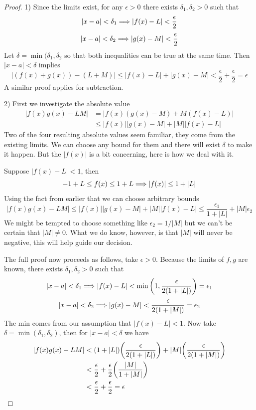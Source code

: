 \begin{proof}
	1) Since the limits exist, for any $\epsilon > 0$ there exists $\delta_1, \delta_2 > 0$ such that
	\[ |x - a| < \delta_1 \Longrightarrow |f(x) - L| < \frac{\epsilon}{2} \]
	\[ |x - a| < \delta_2 \Longrightarrow |g(x) - M| < \frac{\epsilon}{2} \]
	Let $\delta = \min(\delta_1, \delta_2$ so that both inequalities can be true at the same time. Then $|x - a| < \delta$ implies
	\[ |(f(x) + g(x)) - (L + M)| \leq |f(x) - L| + |g(x) - M| < \frac{\epsilon}{2} + \frac{\epsilon}{2} = \epsilon \]
	A similar proof applies for subtraction.
	
	2) First we investigate the absolute value
	\begin{align*}
		|f(x)g(x) - LM| &= |f(x) (g(x) - M) + M(f(x) - L)| \\
		&\leq |f(x)| |g(x) - M| + |M| |f(x) - L| 
	\end{align*}
	Two of the four resulting absolute values seem familiar, they come from the existing limits. We can choose any bound for them and there will exist $\delta$ to make it happen. But the $|f(x)|$ is a bit concerning, here is how we deal with it.
	
	Suppose $|f(x) - L| < 1$, then
	\[ -1 + L \leq f(x) \leq 1 + L \Longrightarrow |f(x)| \leq 1 + |L| \]
	Using the fact from earlier that we can choose arbitrary bounds
	\[ |f(x)g(x) - LM| \leq |f(x)| |g(x) - M| + |M| |f(x) - L| \leq \frac{\epsilon_1}{1 + |L|} + |M| \epsilon_2 \]
	We might be tempted to choose something like $\epsilon_2 = 1 / |M|$ but we can't be certain that $|M| \neq 0$. What we do know, however, is that $|M|$ will never be negative, this will help guide our decision.
	
	The full proof now proceeds as follows, take $\epsilon > 0$. Because the limits of $f, g$ are known, there exists $\delta_1, \delta_2 > 0$ such that
	\[ |x - a| < \delta_1 \Longrightarrow |f(x) - L| < \min\qty(1, \frac{\epsilon}{2(1 + |L|)}) = \epsilon_1 \]
	\[ |x - a| < \delta_2 \Longrightarrow |g(x) - M| < \frac{\epsilon}{2(1 + |M|)} = \epsilon_2 \]
	The min comes from our assumption that $|f(x) - L| < 1$. Now take $\delta = \min(\delta_1, \delta_2)$, then for $|x - a| < \delta$ we have
	\begin{align*}
		|f(x)g(x) - LM| &< \qty( 1 + |L| ) \qty( \frac{\epsilon}{2(1 + |L|)} ) + |M| \qty( \frac{\epsilon}{2(1 + |M|)} ) \\
		&< \frac{\epsilon}{2} + \frac{\epsilon}{2} \qty(\frac{|M|}{1 + |M|}) \\
		&< \frac{\epsilon}{2} + \frac{\epsilon}{2} = \epsilon
	\end{align*}
	

\end{proof}
